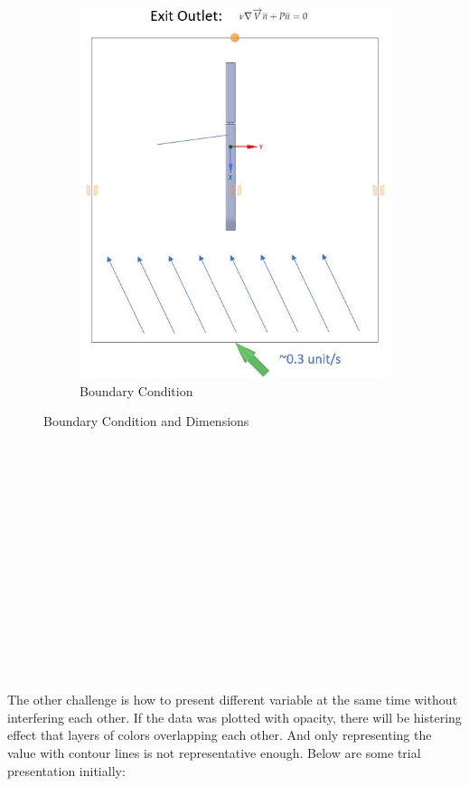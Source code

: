 \documentclass[
	12pt, %
]{fphw}
\begin{document}
\begin{enumerate}[(\itshape 1\normalfont)]
\begin{figure}[h]
\begin{subfigure}[h]{0.4\textwidth}
        \includegraphics[width=\textwidth]{5b.jpg}
        \caption{Boundary Condition}
        \label{fig:1c1}
    \end{subfigure}
    \caption{Boundary Condition and Dimensions}\label{fig:1c}
\end{figure}\\\\\\\\\\\\\\\\\\\\\\\\\\\\
The other challenge is how to present different variable at the same time without interfering each other. If the data was plotted with opacity, there will be histering effect that layers of colors overlapping each other. And only representing the value with contour lines is not representative enough. Below are some trial presentation initially:

\end{enumerate}
\end{document}
